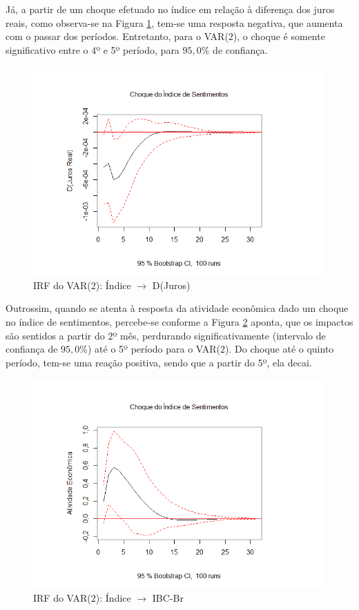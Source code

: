Já, a partir de um choque efetuado no índice em relação à diferença dos juros reais, como observa-se na Figura \ref{figure:irf_indice_selic_model_2}, tem-se uma resposta negativa, que aumenta com o passar dos períodos. Entretanto, para o VAR($2$), o choque é somente significativo entre o 4º e 5º período, para $95,0\%$ de confiança.

\begin{figure}[hbtp]
	\centering
	\caption{IRF do VAR($2$): Índice $\rightarrow$ D(Juros)} \label{figure:irf_indice_selic_model_2}
	\includegraphics[scale = 0.60]{figuras/irf_indice_selic_model_2.PNG}
\end{figure}

Outrossim, quando se atenta à resposta da atividade econômica dado um choque no índice de sentimentos, percebe-se conforme a Figura  \ref{figure:irf_indice_ibcbr_model_2} aponta, que os impactos são sentidos a partir do 2º mês, perdurando significativamente (intervalo de confiança de $95,0\%$) até o 5º período para o VAR($2$). Do choque até o quinto período, tem-se uma reação positiva, sendo que a partir do 5º, ela decai.

\begin{figure}[hbtp]
	\centering
	\caption{IRF do VAR($2$): Índice $\rightarrow$ IBC-Br} \label{figure:irf_indice_ibcbr_model_2}
	\includegraphics[scale = 0.60]{figuras/irf_indice_ibcbr_model_2.PNG}
\end{figure}

